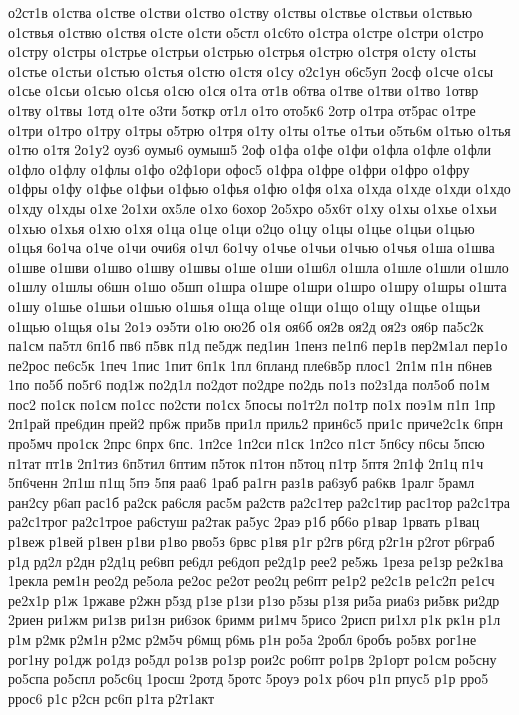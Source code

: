 {о2ст1в
о1ства
о1стве
о1стви
о1ство
о1ству
о1ствы
о1ствье
о1ствьи
о1ствью
о1ствья
о1ствю
о1ствя
о1сте
о1сти
о5стл
о1с6то
о1стра
о1стре
о1стри
о1стро
о1стру
о1стры
о1стрье
о1стрьи
о1стрью
о1стрья
о1стрю
о1стря
о1сту
о1сты
о1стье
о1стьи
о1стью
о1стья
о1стю
о1стя
о1су
о2с1ун
о6с5уп
2осф
о1сче
о1сы
о1сье
о1сьи
о1сью
о1сья
о1сю
о1ся
о1та
от1в
о6тва
о1тве
о1тви
о1тво
1отвр
о1тву
о1твы
1отд
о1те
о3ти
5откр
от1л
о1то
ото5к6
2отр
о1тра
от5рас
о1тре
о1три
о1тро
о1тру
о1тры
о5трю
о1тря
о1ту
о1ты
о1тье
о1тьи
о5ть6м
о1тью
о1тья
о1тю
о1тя
2о1у2
оуз6
оумы6
оумыш5
2оф
о1фа
о1фе
о1фи
о1фла
о1фле
о1фли
о1фло
о1флу
о1флы
о1фо
о2ф1ори
офос5
о1фра
о1фре
о1фри
о1фро
о1фру
о1фры
о1фу
о1фье
о1фьи
о1фью
о1фья
о1фю
о1фя
о1ха
о1хда
о1хде
о1хди
о1хдо
о1хду
о1хды
о1хе
2о1хи
ох5ле
о1хо
6охор
2о5хро
о5х6т
о1ху
о1хы
о1хье
о1хьи
о1хью
о1хья
о1хю
о1хя
о1ца
о1це
о1ци
о2цо
о1цу
о1цы
о1цье
о1цьи
о1цью
о1цья
6о1ча
о1че
о1чи
очи6я
о1чл
6о1чу
о1чье
о1чьи
о1чью
о1чья
о1ша
о1шва
о1шве
о1шви
о1шво
о1шву
о1швы
о1ше
о1ши
о1ш6л
о1шла
о1шле
о1шли
о1шло
о1шлу
о1шлы
о6шн
о1шо
о5шп
о1шра
о1шре
о1шри
о1шро
о1шру
о1шры
о1шта
о1шу
о1шье
о1шьи
о1шью
о1шья
о1ща
о1ще
о1щи
о1що
о1щу
о1щье
о1щьи
о1щью
о1щья
о1ы
2о1э
оэ5ти
о1ю
ою2б
о1я
оя6б
оя2в
оя2д
оя2з
оя6р
па5с2к
па1см
па5тл
6п1б
пв6
п5вк
п1д
пе5дж
пед1ин
1пенз
пе1п6
пер1в
пер2м1ал
пер1о
пе2рос
пе6с5к
1печ
1пис
1пит
6п1к
1пл
6планд
пле6в5р
плос1
2п1м
п1н
п6нев
1по
по5б
по5г6
под1ж
по2д1л
по2дот
по2дре
по2дь
по1з
по2з1да
пол5об
по1м
пос2
по1ск
по1см
по1сс
по2сти
по1сх
5посы
по1т2л
по1тр
по1х
поэ1м
п1п
1пр
2п1рай
пре6дин
прей2
пр6ж
при5в
при1л
приль2
прин6с5
при1с
приче2с1к
6прн
про5мч
про1ск
2прс
6прх
6пс.
1п2се
1п2си
п1ск
1п2со
п1ст
5п6су
п6сы
5псю
п1тат
пт1в
2п1тиз
6п5тил
6птим
п5ток
п1тон
п5тоц
п1тр
5птя
2п1ф
2п1ц
п1ч
5п6ченн
2п1ш
п1щ
5пэ
5пя
раа6
1раб
ра1гн
раз1в
ра6зуб
ра6кв
1ралг
5рамл
ран2су
р6ап
рас1б
ра2ск
ра6сля
рас5м
ра2ств
ра2с1тер
ра2с1тир
рас1тор
ра2с1тра
ра2с1трог
ра2с1трое
ра6стуш
ра2так
ра5ус
2раэ
р1б
рб6о
р1вар
1рвать
р1вац
р1веж
р1вей
р1вен
р1ви
р1во
рво5з
6рвс
р1вя
р1г
р2гв
р6гд
р2г1н
р2гот
р6граб
р1д
рд2л
р2дн
р2д1ц
ре6вп
ре6дл
ре6доп
ре2д1р
рее2
ре5жь
1реза
ре1зр
ре2к1ва
1рекла
рем1н
рео2д
ре5ола
ре2ос
ре2от
рео2ц
ре6пт
ре1р2
ре2с1в
ре1с2п
ре1сч
ре2х1р
р1ж
1ржаве
р2жн
р5зд
р1зе
р1зи
р1зо
р5зы
р1зя
ри5а
риа6з
ри5вк
ри2др
2риен
ри1жм
ри1зв
ри1зн
ри6зок
6римм
ри1мч
5рисо
2рисп
ри1хл
р1к
рк1н
р1л
р1м
р2мк
р2м1н
р2мс
р2м5ч
р6мщ
р6мь
р1н
ро5а
2робл
6робъ
ро5вх
рог1не
рог1ну
ро1дж
ро1дз
ро5дл
ро1зв
ро1зр
рои2с
ро6пт
ро1рв
2р1орт
ро1см
ро5сну
ро5спа
ро5спл
ро5с6ц
1росш
2ротд
5ротс
5роуэ
ро1х
р6оч
р1п
рпус5
р1р
рро5
ррос6
р1с
р2сн
рс6п
р1та
р2т1акт
}
